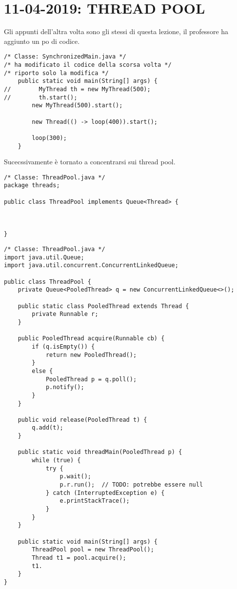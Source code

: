 

\newpage
\section{11-04-2019: THREAD POOL}
\noindent Gli appunti dell'altra volta sono gli stessi di questa lezione, il professore ha aggiunto un po di codice.
 


\begin{lstlisting}[basicstyle=\small,]
/* Classe: SynchronizedMain.java */
/* ha modificato il codice della scorsa volta */
/* riporto solo la modifica */
    public static void main(String[] args) {
//        MyThread th = new MyThread(500);
//        th.start();
        new MyThread(500).start();

        new Thread(() -> loop(400)).start();

        loop(300);
    }
\end{lstlisting}

\noindent Sucecssivamente è tornato a concentrarsi sui thread pool.

\begin{lstlisting}[basicstyle=\small,]
/* Classe: ThreadPool.java */
package threads;

public class ThreadPool implements Queue<Thread> {



}

\end{lstlisting}

\begin{lstlisting}[basicstyle=\small,]
/* Classe: ThreadPool.java */
import java.util.Queue;
import java.util.concurrent.ConcurrentLinkedQueue;

public class ThreadPool {
    private Queue<PooledThread> q = new ConcurrentLinkedQueue<>();

    public static class PooledThread extends Thread {
        private Runnable r;
    }

    public PooledThread acquire(Runnable cb) {
        if (q.isEmpty()) {
            return new PooledThread();
        }
        else {
            PooledThread p = q.poll();
            p.notify();
        }
    }

    public void release(PooledThread t) {
        q.add(t);
    }

    public static void threadMain(PooledThread p) {
        while (true) {
            try {
                p.wait();
                p.r.run();  // TODO: potrebbe essere null
            } catch (InterruptedException e) {
                e.printStackTrace();
            }
        }
    }

    public static void main(String[] args) {
        ThreadPool pool = new ThreadPool();
        Thread t1 = pool.acquire();
        t1.
    }
}


\end{lstlisting}




